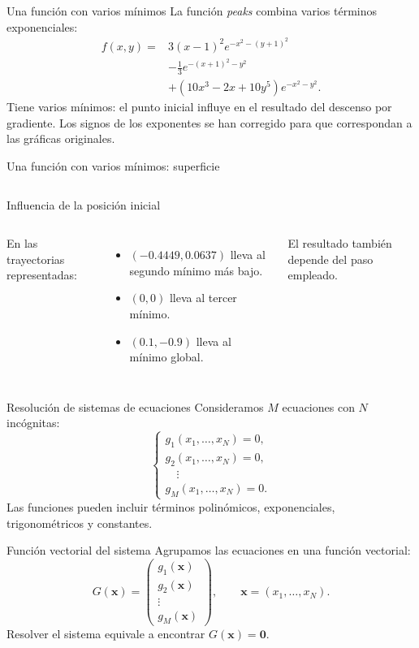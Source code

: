 \documentclass[main.tex]{subfiles}
\begin{document}
\begin{frame}[t]{Una función con varios mínimos}
\small
La función \textit{peaks} combina varios términos exponenciales:
\begin{align*}
f(x,y)={}&3(x-1)^2e^{-x^2-(y+1)^2}\\
&-\tfrac13e^{-(x+1)^2-y^2}\\
&+(10x^3-2x+10y^5)e^{-x^2-y^2}.
\end{align*}
Tiene varios mínimos: el punto inicial influye en el resultado del descenso por gradiente.
\medskip
\scriptsize Los signos de los exponentes se han corregido para que correspondan a las gráficas originales.
\end{frame}
\begin{frame}[t]{Una función con varios mínimos: superficie}
\begin{columns}\end{columns}
\end{frame}
\begin{frame}[t]{Influencia de la posición inicial}
\begin{columns}\small
En las trayectorias representadas:
\begin{itemize}
\item $(-0.4449,0.0637)$ lleva al segundo mínimo más bajo.
\item $(0,0)$ lleva al tercer mínimo.
\item $(0.1,-0.9)$ lleva al mínimo global.
\end{itemize}
El resultado también depende del paso empleado.
\end{columns}
\end{frame}
\begin{frame}[t]{Resolución de sistemas de ecuaciones}
Consideramos $M$ ecuaciones con $N$ incógnitas:
\[\begin{cases}
g_1(x_1,\ldots,x_N)=0,\\
g_2(x_1,\ldots,x_N)=0,\\
\quad\vdots\\
g_M(x_1,\ldots,x_N)=0.
\end{cases}\]
Las funciones pueden incluir términos polinómicos, exponenciales, trigonométricos y constantes.
\end{frame}
\begin{frame}[t]{Función vectorial del sistema}
Agrupamos las ecuaciones en una función vectorial:
\[G(\boldsymbol{x})=
\begin{pmatrix}g_1(\boldsymbol{x})\\g_2(\boldsymbol{x})\\\vdots\\g_M(\boldsymbol{x})\end{pmatrix},
\qquad \boldsymbol{x}=(x_1,\ldots,x_N).\]
Resolver el sistema equivale a encontrar $G(\boldsymbol{x})=\boldsymbol{0}$.
\end{frame}
\end{document}
